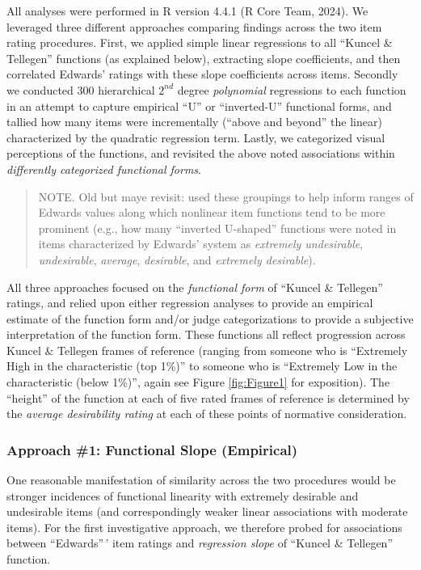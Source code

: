\documentclass[
  ,jou]{apa6}
\begin{document}
All analyses were performed in R version 4.4.1 (R Core Team, 2024). We leveraged three different approaches comparing findings across the two item rating procedures. First, we applied simple linear regressions to all ``Kuncel \& Tellegen'' functions (as explained below), extracting slope coefficients, and then correlated Edwards' ratings with these slope coefficients across items. Secondly we conducted 300 hierarchical \(2^{nd}\) degree \emph{polynomial} regressions to each function in an attempt to capture empirical ``U'' or ``inverted-U'' functional forms, and tallied how many items were incrementally (``above and beyond'' the linear) characterized by the quadratic regression term. Lastly, we categorized visual perceptions of the functions, and revisited the above noted associations within \emph{differently categorized functional forms}.

\begin{quote}
NOTE. Old but maye revisit: used these groupings to help inform ranges of Edwards values along which nonlinear item functions tend to be more prominent (e.g., how many ``inverted U-shaped'' functions were noted in items characterized by Edwards' system as \emph{extremely undesirable}, \emph{undesirable}, \emph{average}, \emph{desirable}, and \emph{extremely desirable}).
\end{quote}

All three approaches focused on the \emph{functional form} of ``Kuncel \& Tellegen'' ratings, and relied upon either regression analyses to provide an empirical estimate of the function form and/or judge categorizations to provide a subjective interpretation of the function form. These functions all reflect progression across Kuncel \& Tellegen frames of reference (ranging from someone who is ``Extremely High in the characteristic (top 1\%)'' to someone who is ``Extremely Low in the characteristic (below 1\%)'', again see Figure \ref{fig:Figure1} for exposition). The ``height'' of the function at each of five rated frames of reference is determined by the \emph{average desirability rating} at each of these points of normative consideration.

\subsubsection{Approach \#1: Functional Slope (Empirical)}\label{approach-1-functional-slope-empirical}

One reasonable manifestation of similarity across the two procedures would be stronger incidences of functional linearity with extremely desirable and undesirable items (and correspondingly weaker linear associations with moderate items). For the first investigative approach, we therefore probed for associations between ``Edwards''\,' item ratings and \emph{regression slope} of ``Kuncel \& Tellegen'' function.
\end{document}
